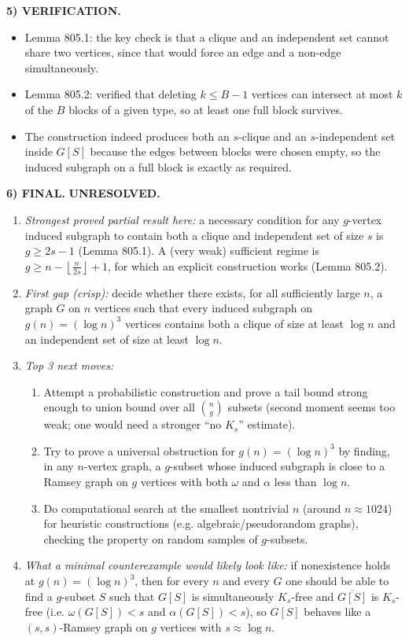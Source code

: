 \medskip
\noindent\textbf{5) VERIFICATION.}

\begin{itemize}
\item Lemma 805.1: the key check is that a clique and an independent set cannot share two vertices, since that would force an edge and a non-edge simultaneously.
\item Lemma 805.2: verified that deleting $k\le B-1$ vertices can intersect at most $k$ of the $B$ blocks of a given type, so at least one full block survives.
\item The construction indeed produces both an $s$-clique and an $s$-independent set inside $G[S]$ because the edges between blocks were chosen empty, so the induced subgraph on a full block is exactly as required.
\end{itemize}

\medskip
\noindent\textbf{6) FINAL.} \textbf{UNRESOLVED.}

\begin{enumerate}
\item[(i)] \emph{Strongest proved partial result here:} a necessary condition for any $g$-vertex induced subgraph to contain both a clique and independent set of size $s$ is $g\ge 2s-1$ (Lemma 805.1). A (very weak) sufficient regime is $g\ge n-\left\lfloor \frac{n}{2s}\right\rfloor+1$, for which an explicit construction works (Lemma 805.2).
\item[(ii)] \emph{First gap (crisp):} decide whether there exists, for all sufficiently large $n$, a graph $G$ on $n$ vertices such that every induced subgraph on $g(n)=(\log n)^3$ vertices contains both a clique of size at least $\log n$ and an independent set of size at least $\log n$.
\item[(iii)] \emph{Top 3 next moves:}
  \begin{enumerate}
  \item Attempt a probabilistic construction and prove a tail bound strong enough to union bound over all $\binom{n}{g}$ subsets (second moment seems too weak; one would need a stronger ``no $K_s$'' estimate).
  \item Try to prove a universal obstruction for $g(n)=(\log n)^3$ by finding, in any $n$-vertex graph, a $g$-subset whose induced subgraph is close to a Ramsey graph on $g$ vertices with both $\omega$ and $\alpha$ less than $\log n$.
  \item Do computational search at the smallest nontrivial $n$ (around $n\approx 1024$) for heuristic constructions (e.g. algebraic/pseudorandom graphs), checking the property on random samples of $g$-subsets.
  \end{enumerate}
\item[(iv)] \emph{What a minimal counterexample would likely look like:} if nonexistence holds at $g(n)=(\log n)^3$, then for every $n$ and every $G$ one should be able to find a $g$-subset $S$ such that $G[S]$ is simultaneously $K_s$-free and $\overline{G[S]}$ is $K_s$-free (i.e. $\omega(G[S])<s$ and $\alpha(G[S])<s$), so $G[S]$ behaves like a $(s,s)$-Ramsey graph on $g$ vertices with $s\approx \log n$.
\end{enumerate}




